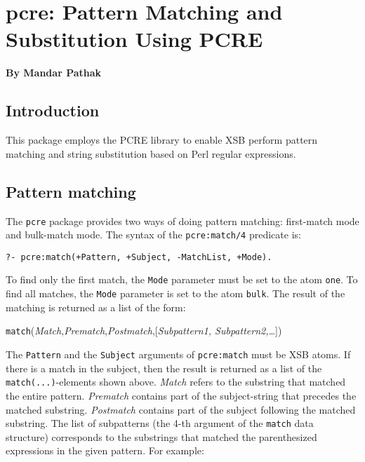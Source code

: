 
\chapter{pcre: Pattern Matching and Substitution Using PCRE}
\label{chap-pcre}

\begin{center}
{\Large {\bf By Mandar Pathak}}
\end{center}

\section{Introduction}

This package employs the PCRE library to enable XSB perform pattern
matching and string substitution based on Perl regular expressions.

\section{Pattern matching}

The {\tt pcre} package provides two ways of doing pattern matching:
first-match mode and bulk-match mode. The syntax of the {\tt pcre:match/4}
predicate is:

\begin{verbatim}
?- pcre:match(+Pattern, +Subject, -MatchList, +Mode).
\end{verbatim}

To find only the first match, the {\tt Mode}  parameter must be set to the atom
{\tt one}. To find all matches, the {\tt Mode}  parameter is set to the atom
{\tt bulk}. The result of the matching is returned as a list of 
the form:

\begin{center}
\texttt{match}(\textit{Match},\textit{Prematch},\textit{Postmatch},[\textit{Subpattern1, Subpattern2,\ldots}])
\end{center}

The {\tt Pattern} and the {\tt Subject} arguments of {\tt pcre:match} must
be XSB atoms. If there is a match in the subject, then the result is
returned as a list of the \texttt{match(...)}-elements
shown above. \textit{Match} refers to the
substring that matched the entire pattern. \textit{Prematch} contains part
of the subject-string that precedes the matched substring.
\textit{Postmatch} contains part of the subject following the matched
substring. The list of subpatterns (the 4-th argument of the {\tt match}
data structure) corresponds to the substrings that matched the
parenthesized expressions in the given pattern. For example:

